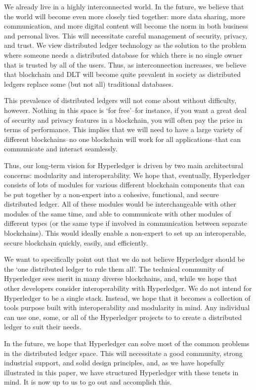 We already live in a highly interconnected world. In the future, we believe that the world will become even more closely tied together: more data sharing, more communication, and more digital content will become the norm in both business and personal lives. This will necessitate careful management of security, privacy, and trust. We view distributed ledger technology as the solution to the problem where someone needs a distributed database for which there is no single owner that is trusted by all of the users. Thus, as interconnection increases, we believe that blockchain and DLT will become quite prevalent in society as distributed ledgers replace some (but not all) traditional databases.

This prevalence of distributed ledgers will not come about without difficulty, however. Nothing in this space is `for free'--for instance, if you want a great deal of security and privacy features in a blockchain, you will often pay the price in terms of performance. This implies that we will need to have a large variety of different blockchains--no one blockchain will work for all applications--that can communicate and interact seamlessly.

Thus, our long-term vision for Hyperledger is driven by two main architectural concerns: modularity and interoperability. We hope that, eventually, Hyperledger consists of lots of modules for various different blockchain components that can be put together by a non-expert into a cohesive, functional, and secure distributed ledger. All of these modules would be interchangeable with other modules of the same time, and able to communicate with other modules of different types (or the same type if involved in communication between separate blockchains). This would ideally enable a non-expert to set up an interoperable, secure blockchain quickly, easily, and efficiently.

We want to specifically point out that we do not believe Hyperledger should be the `one distributed ledger to rule them all'. The technical community of Hyperledger sees merit in many diverse blockchains, and, while we hope that other developers consider interoperability with Hyperledger.  We do not intend for Hyperledger to be a single stack. Instead, we hope that it becomes a collection of tools purpose built with interoperability and modularity in mind. Any individual can use one, some, or all of the Hyperledger projects to to create a distributed ledger to suit their needs.

In the future, we hope that Hyperledger can solve most of the common problems in the distributed ledger space. This will necessitate a good community, strong industrial support, and solid design principles, and, as we have hopefully illustrated in this paper, we have structured Hyperledger with these tenets in mind. It is now up to us to go out and accomplish this.
